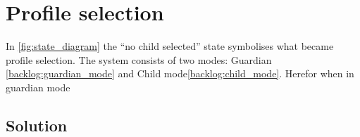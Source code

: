 \section{Profile selection}
\label{design:profile_selection}
In \autoref{fig:state_diagram} the ``no child selected'' state symbolises what became profile selection. The \giraf[] system consists of two modes: Guardian \autoref{backlog:guardian_mode} and Child mode\autoref{backlog:child_mode}. Herefor when in guardian mode 


\subsection{Solution}

